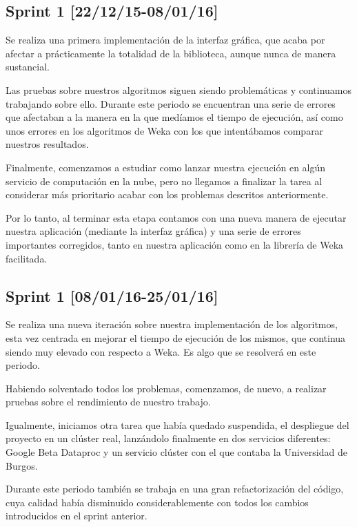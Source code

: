 \subsection{Sprint 1 [22/12/15-08/01/16]}

Se realiza una primera implementación de la interfaz gráfica, que acaba por afectar a prácticamente la totalidad de la biblioteca, aunque nunca de manera sustancial.

Las pruebas sobre nuestros algoritmos siguen siendo problemáticas y continuamos trabajando sobre ello. Durante este periodo se encuentran una serie de errores que afectaban a la manera en la que medíamos el tiempo de ejecución, así como unos errores en los algoritmos de Weka con los que intentábamos comparar nuestros resultados.

Finalmente, comenzamos a estudiar como lanzar nuestra ejecución en algún servicio de computación en la nube, pero no llegamos a finalizar la tarea al considerar más prioritario acabar con los problemas descritos anteriormente.

Por lo tanto, al terminar esta etapa contamos con una nueva manera de ejecutar nuestra aplicación (mediante la interfaz gráfica) y una serie de errores importantes corregidos, tanto en nuestra aplicación como en la librería de Weka facilitada.

\subsection{Sprint 1 [08/01/16-25/01/16]}

Se realiza una nueva iteración sobre nuestra implementación de los algoritmos, esta vez centrada en mejorar el tiempo de ejecución de los mismos, que continua siendo muy elevado con respecto a Weka. Es algo que se resolverá en este periodo.

Habiendo solventado todos los problemas, comenzamos, de nuevo, a realizar pruebas sobre el rendimiento de nuestro trabajo.

Igualmente, iniciamos otra tarea que había quedado suspendida, el despliegue del proyecto en un clúster real, lanzándolo finalmente en dos servicios diferentes: Google Beta Dataproc \cite{dataprocSoft} y un servicio clúster con el que contaba la Universidad de Burgos.

Durante este periodo también se trabaja en una gran refactorización del código, cuya calidad había disminuido considerablemente con todos los cambios introducidos en el sprint anterior.

